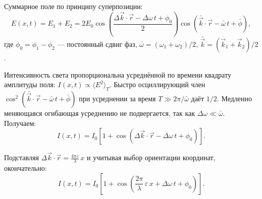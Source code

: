 \documentclass[12pt, a4paper]{article}
\begin{document}
Суммарное поле по принципу суперпозиции:
\begin{equation}
    E(x, t) = E_1 + E_2 = 2E_0 \cos\left(\frac{\Delta\vec{k}\cdot\vec{r} - \Delta\omega\, t + \phi_0}{2}\right) \cos\left(\bar{\vec{k}}\cdot\vec{r} - \bar{\omega}\, t + \bar{\phi}\right),
\end{equation}
где $\phi_0 = \phi_1 - \phi_2$ --- постоянный сдвиг фаз, $\bar{\omega} = (\omega_1 + \omega_2)/2$, $\bar{\vec{k}} = (\vec{k}_1 + \vec{k}_2)/2$.

Интенсивность света пропорциональна усреднённой по времени квадрату амплитуды поля: $I(x, t) \propto \langle E^2 \rangle_T$. Быстро осциллирующий член $\cos^2(\bar{\vec{k}}\cdot\vec{r} - \bar{\omega}\, t + \bar{\phi})$ при усреднении за время $T \gg 2\pi/\bar{\omega}$ даёт $1/2$. Медленно меняющаяся огибающая усреднению не подвергается, так как $\Delta\omega \ll \bar{\omega}$. Получаем:
\begin{equation}
    I(x, t) = I_0\left[1 + \cos\left(\Delta\vec{k}\cdot\vec{r} - \Delta\omega\, t + \phi_0\right)\right].
\end{equation}

Подставляя $\Delta\vec{k}\cdot\vec{r} = \frac{4\pi\varepsilon}{\lambda}\,x$ и учитывая выбор ориентации координат, окончательно:
\begin{equation}
    \boxed{I(x, t) = I_0\left[1 + \cos\left(\frac{2\pi}{\lambda}\,\varepsilon\, x + \Delta\omega\, t + \phi_0\right)\right].}
\end{equation}
\end{document}
